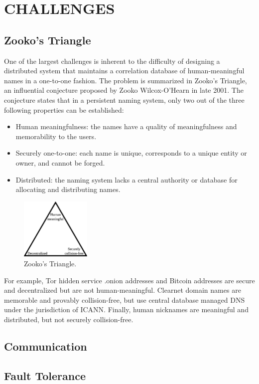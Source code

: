 
\chapter{\uppercase{Challenges}}

\section{Zooko's Triangle}

One of the largest challenges is inherent to the difficulty of designing a distributed system that maintains a correlation database of human-meaningful names in a one-to-one fashion. The problem is summarized in Zooko's Triangle, an influential conjecture proposed by Zooko Wilcox-O'Hearn in late 2001. The conjecture states that in a persistent naming system, only two out of the three following properties can be established:\cite{Ferdous2009}

\begin{itemize}
  \item Human meaningfulness: the names have a quality of meaningfulness and memorability to the users. 
  \item Securely one-to-one: each name is unique, corresponds to a unique entity or owner, and cannot be forged.
  \item Distributed: the naming system lacks a central authority or database for allocating and distributing names.
\end{itemize}

\begin{figure}[htbp]
	\centering
	\includegraphics[width=0.3\textwidth]{images/Zooko.eps}
	\caption{Zooko's Triangle.}
	\label{fig:figure8}
\end{figure}

For example, Tor hidden service .onion addresses and Bitcoin addresses are secure and decentralized but are not human-meaningful. Clearnet domain names are memorable and provably collision-free, but use central database managed DNS under the jurisdiction of ICANN. Finally, human nicknames are meaningful and distributed, but not securely collision-free.\cite{Stiegler2005}

\section{Communication}

\section{Fault Tolerance}
